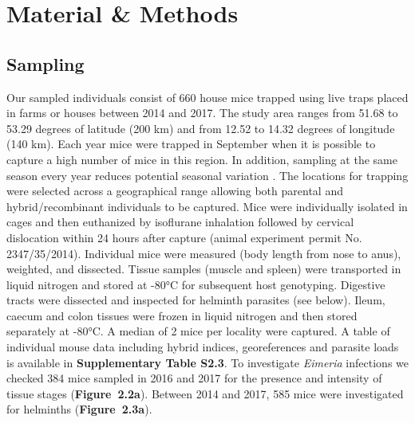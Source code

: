 \section{Material \&  Methods}
\subsection{Sampling}
Our sampled individuals consist of 660 house mice trapped using live traps placed in farms or houses between 2014 and 2017. The study area ranges from 51.68 to 53.29 degrees of latitude (200 km) and from 12.52 to 14.32 degrees of longitude (140 km). Each year mice were trapped in September when it is possible to capture a high number of mice in this region. In addition, sampling at the same season every year reduces potential seasonal variation \citep{abu-madi_seasonal_2000, haukisalmi_population_1988}. The locations for trapping were selected across a geographical range allowing both parental and hybrid/recombinant individuals to be captured. Mice were individually isolated in cages and then euthanized by isoflurane inhalation followed by cervical dislocation within 24 hours after capture (animal experiment permit No. 2347/35/2014). Individual mice were measured (body length from nose to anus), weighted, and dissected. Tissue samples (muscle and spleen) were transported in liquid nitrogen and stored at -80°C for subsequent host genotyping. Digestive tracts were dissected and inspected for helminth parasites (see below). Ileum, caecum and colon tissues were frozen in liquid nitrogen and then stored separately at -80°C. A median of 2 mice per locality were captured. A table of individual mouse data including hybrid indices, georeferences and parasite loads is available in \textbf{Supplementary Table S2.3}. To investigate \textit{Eimeria} infections we checked 384 mice sampled in 2016 and 2017 for the presence and intensity of tissue stages (\textbf{Figure~2.2a}). Between 2014 and 2017, 585 mice were investigated for helminths (\textbf{Figure~2.3a}). 

